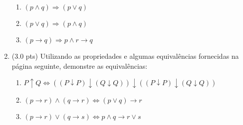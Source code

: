 \documentclass[12pt]{article}
\begin{document}
\begin{enumerate}
\begin{enumerate}
\item $(p \wedge q) \Rightarrow (p \vee q)$
\item $(p \vee q) \Rightarrow (p \wedge q)$


\item $(p \rightarrow q) \Rightarrow p \wedge r \rightarrow q $

\end{enumerate}


\item (3.0 pts) Utilizando as propriedades e algumas equivalências
fornecidas na página seguinte, demonstre as equivalências:

\begin{enumerate}
\setlength{\itemsep}{-2pt}



\item $P \uparrow Q \Leftrightarrow ((P\downarrow P)\downarrow (Q\downarrow Q)) \downarrow ((P\downarrow P)\downarrow(Q\downarrow Q))$


\item  $(p \rightarrow r) \wedge (q \rightarrow r) \Leftrightarrow (p \vee  q) \rightarrow r $ %


\item $(p \rightarrow r)  \vee (q \rightarrow s) \Leftrightarrow p \wedge q \rightarrow  r \vee s $  %




\end{enumerate}






\end{enumerate}
\newpage
\end{document}
